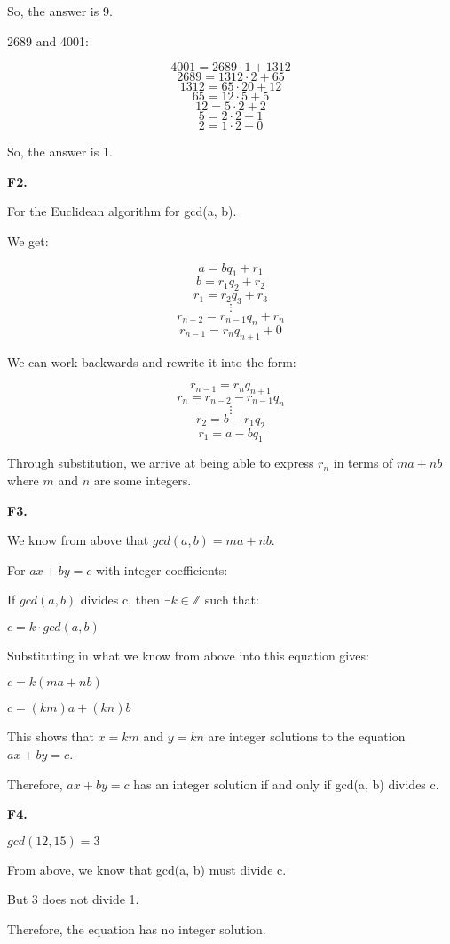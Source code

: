 \documentclass{article}
\newcommand{\ZZ}{\mathbb{Z}}
\begin{document}
So, the answer is 9.

2689 and 4001:

\[4001 = 2689 \cdot 1 + 1312\]
\[2689 = 1312 \cdot 2 + 65\]
\[1312 = 65 \cdot 20 + 12\]
\[65 = 12 \cdot 5 + 5\]
\[12 = 5 \cdot 2 + 2\]
\[5 = 2 \cdot 2 + 1\]
\[2 = 1 \cdot 2 + 0\]

So, the answer is 1.

\textbf{F2.}

For the Euclidean algorithm for gcd(a, b).

We get:

\[a = b q_1 + r_1\]
\[b = r_1 q_2 + r_2\]
\[r_1 = r_2 q_3 + r_3\]
\[\vdots\]
\[r_{n-2} = r_{n-1} q_n + r_n\]
\[r_{n-1} = r_n q_{n+1} + 0\]

We can work backwards and rewrite it into the form:

\[r_{n-1} = r_n q_{n+1}\]
\[r_n = r_{n-2} - r_{n-1} q_n\]
\[\vdots\]
\[r_2 = b - r_1 q_2\]
\[r_1 = a - b q_1\]

Through substitution, we arrive at being able to express $r_n$ in terms of $m a + n b$
where $m$ and $n$ are some integers.

\textbf{F3.}

We know from above that $gcd(a, b) = m a + n b$.

For $a x + b y = c$ with integer coefficients:

If $gcd(a, b)$ divides c, then $\exists k \in \ZZ$ such that:

$c = k \cdot gcd(a, b)$

Substituting in what we know from above into this equation gives:

$c = k(m a + n b)$

$c = (k m) a + (k n) b$

This shows that $x = k m$ and $y = k n$ are integer solutions to the equation
$a x + b y = c$.

Therefore, $a x + b y = c$ has an integer solution if and only if gcd(a, b) divides c.

\textbf{F4.}

$gcd(12, 15) = 3$

From above, we know that gcd(a, b) must divide c.

But 3 does not divide 1.

Therefore, the equation has no integer solution.
\end{document}
